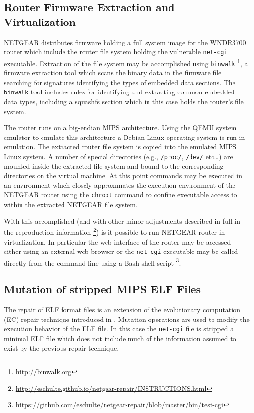 \documentclass{sigcomm-alternate}
\begin{document}
\subsection{Router Firmware Extraction and Virtualization}
\label{sec-3-1}
NETGEAR distributes firmware holding a full system image for the
WNDR3700 router which include the router file system holding the
vulnerable \texttt{net-cgi} executable.  Extraction of the file system may be
accomplished using \texttt{binwalk} \footnote{\url{http://binwalk.org}}, a firmware extraction tool which
scans the binary data in the firmware file searching for signatures
identifying the types of embedded data sections.  The \texttt{binwalk} tool
includes rules for identifying and extracting common embedded data
types, including a squashfs \cite{lougher2006squashfs} section which in
this case holds the router's file system.

The router runs on a big-endian MIPS architecture.  Using the QEMU
\cite{bellard2005qemu} system emulator to emulate this architecture a
Debian Linux operating system is run in emulation.  The extracted
router file system is copied into the emulated MIPS Linux system.  A
number of special directories (e.g., \texttt{/proc/}, \texttt{/dev/} etc\ldots{}) are
mounted inside the extracted file system and bound to the
corresponding directories on the virtual machine.  At this point
commands may be executed in an environment which closely approximates
the execution environment of the NETGEAR router using the \texttt{chroot}
command to confine executable access to within the extracted NETGEAR
file system.

With this accomplished (and with other minor adjustments described in
full in the reproduction information \footnote{\url{http://eschulte.github.io/netgear-repair/INSTRUCTIONS.html}}) is it possible to run
NETGEAR router in virtualization.  In particular the web interface of
the router may be accessed either using an external web browser or the
\texttt{net-cgi} executable may be called directly from the command line
using a Bash shell script \footnote{\url{https://github.com/eschulte/netgear-repair/blob/master/bin/test-cgi}}.
\subsection{Mutation of stripped MIPS ELF Files}
\label{sec-3-2}
The repair of ELF format files is an extension of the evolutionary
computation (EC) repair technique introduced in
\cite{schulte2013embedded}.  Mutation operations are used to modify the
execution behavior of the ELF file.  In this case the \texttt{net-cgi} file
is stripped a minimal ELF file which does not include much of the
information assumed to exist by the previous repair technique.
\end{document}
